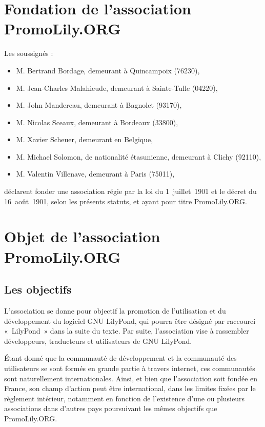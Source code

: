 \documentclass[a4wide,12pt]{scrartcl}
\newcommand{\nomAssoc}{PromoLily.ORG\xspace}
\begin{document}
\section{Fondation de l'association \nomAssoc}

Les soussignés :
\begin{itemize}
\item M. Bertrand Bordage, demeurant à Quincampoix (76230),
\item M. Jean-Charles Malahieude, demeurant à Sainte-Tulle (04220),
\item M. John Mandereau, demeurant à Bagnolet (93170),
\item M. Nicolas Sceaux, demeurant à Bordeaux (33800),
\item M. Xavier Scheuer, demeurant en Belgique,
\item M. Michael Solomon, de nationalité étasunienne,
  demeurant à Clichy (92110),
\item M. Valentin Villenave, demeurant à Paris (75011),
\end{itemize}
déclarent fonder une association régie par la loi du 1\ier{}~juillet~1901
et le décret du 16~août~1901, selon les présents statuts, et ayant
pour titre \nomAssoc.


\section{Objet de l'association \nomAssoc}

\subsection{Les objectifs}

L'association se donne pour objectif la promotion de l'utilisation et
du développement du logiciel GNU LilyPond, qui pourra être désigné par
raccourci «~LilyPond~» dans la suite du texte. Par suite,
l’association vise à rassembler développeurs, traducteurs et
utilisateurs de GNU LilyPond.

Étant donné que la communauté de développement et la communauté des
utilisateurs se sont formés en grande partie à travers internet, ces
communautés sont naturellement internationales. Ainsi, et bien que
l'association soit fondée en France, son champ d'action peut être
international, dans les limites fixées par le règlement intérieur,
notamment en fonction de l'existence d'une ou plusieurs associations
dans d'autres pays poursuivant les mêmes objectifs que \nomAssoc.
\end{document}
